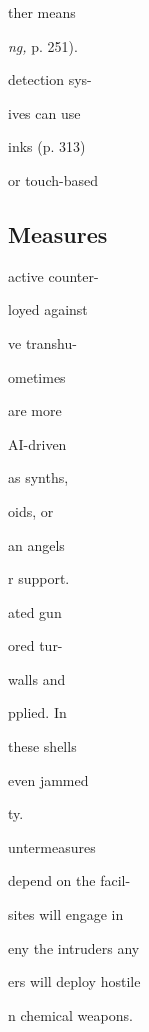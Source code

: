 ther means

\textit{ng, }p. 251). 

detection sys-

ives can use

inks (p. 313)

or touch-based

\subsection{Measures}


active counter-

loyed against

ve  transhu-

ometimes

 are more 

AI-driven

as synths, 

oids,  or 

an angels 

r support. 

ated gun

ored tur-

walls and

pplied. In

these shells

even jammed 

ty.

untermeasures

depend on the facil-

sites will engage in

eny the intruders any

ers will deploy hostile 

n chemical weapons.
